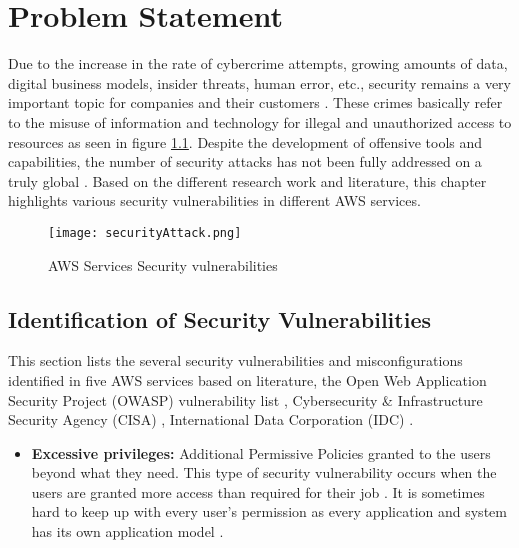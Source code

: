 
\chapter{Problem Statement}

\par Due to the increase in the rate of cybercrime attempts, growing amounts of data, digital business models, insider threats, human error, etc., security remains a very important topic for companies and their customers \cite{40}.  These crimes basically refer to the misuse of information and technology for illegal and unauthorized access to resources as seen in figure \ref{fig:securityAttack}. Despite the development of offensive tools and capabilities, the number of security attacks has not been fully addressed on a truly global \cite{38}. Based on the different research work and literature, this chapter highlights various security vulnerabilities in different AWS services.

\begin{figure}
    \centering
    \texttt{[image: securityAttack.png]}
    \caption{AWS Services Security vulnerabilities}
    \label{fig:securityAttack}
\end{figure}

\section{Identification of Security Vulnerabilities}

\par This section lists the several security vulnerabilities and misconfigurations identified in five AWS services
based on literature, the Open Web Application Security Project (OWASP) vulnerability list \cite{43}, Cybersecurity
\& Infrastructure Security Agency (CISA) \cite{42}, International Data Corporation (IDC) \cite{41}.


\begin{itemize}
    \item \textbf{Excessive privileges:} Additional Permissive Policies granted to the users beyond what they need.
    This type
    of security vulnerability occurs when the users are granted more access than required for their job \cite{44}. It is
    sometimes hard to keep up with every user’s permission as every application and system has its own application
    model \cite{45}.
\end{itemize}

